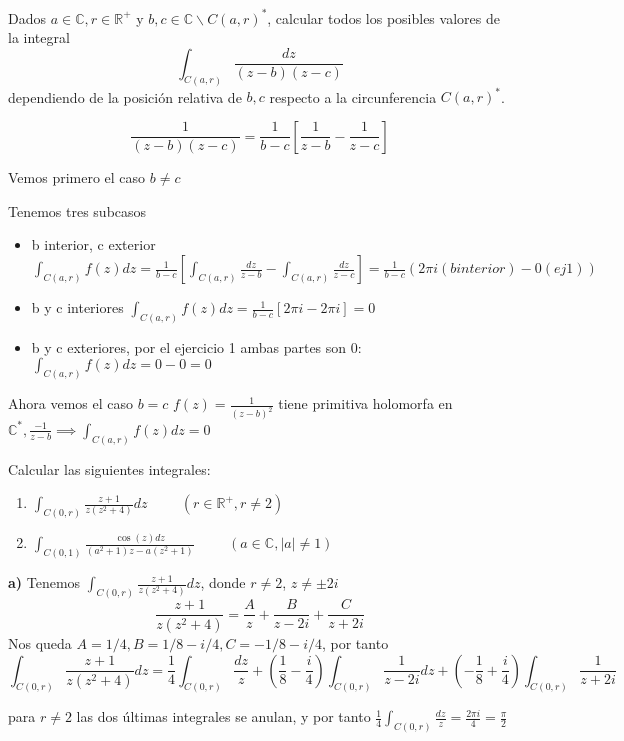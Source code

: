 \begin{ejer}
	Dados $a\in\mathbb{C}, r\in\mathbb{R}^+$ y $b,c\in\mathbb{C}\backslash C(a,r)^{\ast}$, calcular todos los posibles valores de la integral
	$$ \int_{C(a,r)} \frac{dz}{(z-b)(z-c)} $$
	dependiendo de la posición relativa de $b,c$ respecto a la circunferencia $C(a,r)^{\ast}$.
\end{ejer}

$$\frac{1}{(z-b)(z-c)} = \frac{1}{b-c} [\frac{1}{z-b}-\frac{1}{z-c}]$$

Vemos primero el caso $b\not = c$

Tenemos tres subcasos
\begin{itemize}
	\item b interior, c exterior $\int_{C(a,r)} f(z)dz = \frac{1}{b-c} [ \int_{C(a,r)} \frac{dz}{z-b} - \int_{C(a,r)} \frac{dz}{z-c} ] = \frac{1}{b-c} (2\pi i (b interior) - 0 (ej1))$
	
	\item b y c interiores $\int_{C(a,r)} f(z)dz =  \frac{1}{b-c}[2\pi i - 2\pi i] = 0$
	
	\item b y c exteriores, por el ejercicio 1 ambas partes son $0$: $\int_{C(a,r)} f(z)dz = 0-0 = 0$
\end{itemize}

Ahora vemos el caso $b=c$
$f(z) = \frac{1}{(z-b)^2}$ tiene primitiva holomorfa en $\mathbb{C}^{\ast}, \frac{-1}{z-b} \implies \int_{C(a,r)} f(z)dz = 0 $



\begin{ejer}
	Calcular las siguientes integrales:
	\begin{enumerate}[label=(\alph*)]
		\item $\int_{C(0,r)} \frac{z+1}{z(z^2+4)}dz \hspace{1cm} (r\in\mathbb{R}^+, r\not =2)$
		\item $\int_{C(0,1)} \frac{\cos(z)dz}{(a^2+1)z-a(z^2+1)} \hspace{1cm} (a\in\mathbb{C}, |a|\not =1)$
	\end{enumerate}
\end{ejer}
\begin{sol}

\textbf{a)}
Tenemos $\int_{C(0,r)} \frac{z+1}{z(z^2+4)} dz$, donde $r\not = 2$, $z\not = \pm 2i$
$$\frac{z+1}{z(z^2+4)} = \frac{A}{z} + \frac{B}{z-2i} + \frac{C}{z+2i}$$
Nos queda $A = 1/4, B=1/8-i/4, C = -1/8-i/4$, por tanto
$$\int_{C(0,r)} \frac{z+1}{z(z^2+4)} dz = \frac{1}{4} \int_{C(0,r)} \frac{dz}{z} + (\frac{1}{8}-\frac{i}{4})\int_{C(0,r)} \frac{1}{z-2i}dz + (-\frac{1}{8}+\frac{i}{4}) \int_{C(0,r)} \frac{1}{z+2i}$$

para $r\not = 2$ las dos últimas integrales se anulan, y por tanto $\frac{1}{4}\int_{C(0,r)} \frac{dz}{z} = \frac{2\pi i}{4} = \frac{\pi}{2}$

\end{sol}


